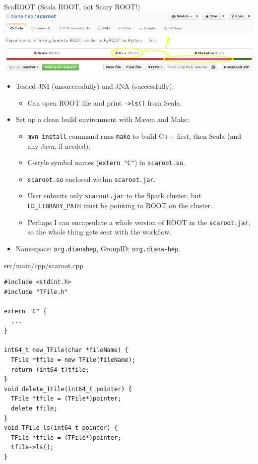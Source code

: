 \documentclass{beamer}
\begin{document}
\begin{frame}{ScaROOT {\small (Scala ROOT, not Scary ROOT!)}}
\includegraphics[width=\linewidth]{scaroot_languages.png}

\vspace{0.2 cm}
\begin{itemize}
\item Tested JNI (unsuccessfully) and JNA (successfully).
\begin{itemize}
\item Can open ROOT file and print {\tt ->ls()} from Scala.
\end{itemize}
\item Set up a clean build environment with Maven and Make:
\begin{itemize}
\item {\tt mvn install} command runs {\tt make} to build C++ first, then Scala (and any Java, if needed).
\item C-style symbol names ({\tt extern "C"}) in {\tt scaroot.so}.
\item {\tt scaroot.so} enclosed within {\tt scaroot.jar}.
\item User submits only {\tt scaroot.jar} to the Spark cluster, but {\tt LD\_LIBRARY\_PATH} must be pointing to ROOT on the cluster.
\item Perhaps I can encapsulate a whole version of ROOT in the {\tt scaroot.jar}, so the whole thing gets sent with the workflow.
\end{itemize}
\item Namespace: {\tt org.dianahep}, GroupID: {\tt org.diana-hep}.
\end{itemize}
\end{frame}

\begin{frame}[fragile]{src/main/cpp/scaroot.cpp}
\small
\begin{verbatim}
#include <stdint.h>
#include "TFile.h"

extern "C" {
  ...
}

int64_t new_TFile(char *fileName) {
  TFile *tfile = new TFile(fileName);
  return (int64_t)tfile;
}
void delete_TFile(int64_t pointer) {
  TFile *tfile = (TFile*)pointer;
  delete tfile;
}
void TFile_ls(int64_t pointer) {
  TFile *tfile = (TFile*)pointer;
  tfile->ls();
}
\end{verbatim}
\end{frame}
\end{document}
